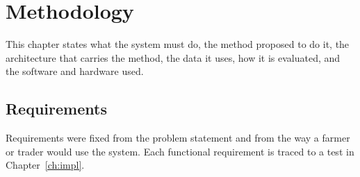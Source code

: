 \chapter{Methodology}
\label{ch:method}

This chapter states what the system must do, the method proposed to do it, the architecture that carries the method, the data it uses, how it is evaluated, and the software and hardware used.

\section{Requirements}
\label{sec:requirements}

Requirements were fixed from the problem statement and from the way a farmer or trader would use the system. Each functional requirement is traced to a test in Chapter~\ref{ch:impl}.

